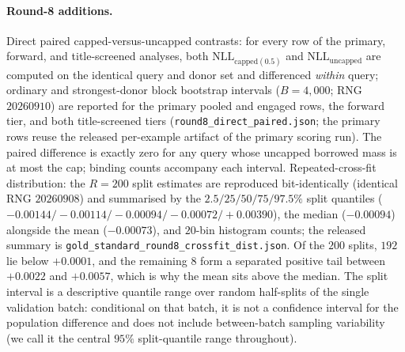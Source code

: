 \documentclass[11pt]{article}
\begin{document}
\paragraph{Round-8 additions.} Direct paired
capped-versus-uncapped contrasts: for every row of the primary, forward,
and title-screened analyses, both $\mathrm{NLL}_{\mathrm{capped}(0.5)}$
and $\mathrm{NLL}_{\mathrm{uncapped}}$ are computed on the identical
query and donor set and differenced \emph{within} query; ordinary and
strongest-donor block bootstrap intervals ($B = 4{,}000$; RNG $20260910$)
are reported for the primary pooled and engaged rows, the forward tier,
and both title-screened tiers (\texttt{round8\_direct\_paired.json}; the
primary rows reuse the released per-example artifact of the primary
scoring run). The paired difference is exactly zero for any query whose
uncapped borrowed mass is at most the cap; binding counts accompany each
interval. Repeated-cross-fit distribution: the $R = 200$ split estimates
are reproduced bit-identically (identical RNG $20260908$) and summarised
by the $2.5/25/50/75/97.5\%$ split quantiles
($-0.00144/-0.00114/-0.00094/-0.00072/+0.00390$), the median
($-0.00094$) alongside the mean ($-0.00073$), and $20$-bin histogram
counts; the released summary is
\texttt{gold\_standard\_\allowbreak round8\_crossfit\_dist.json}. Of the
$200$ splits, $192$ lie below $+0.0001$, and the remaining $8$ form a
separated positive tail between $+0.0022$ and $+0.0057$, which is why
the mean sits above the median. The split interval is a descriptive
quantile range over random half-splits of the single validation batch:
conditional on that batch, it is not a confidence interval for the
population difference and does not include between-batch sampling
variability (we call it the central $95\%$ split-quantile range
throughout).
\end{document}
